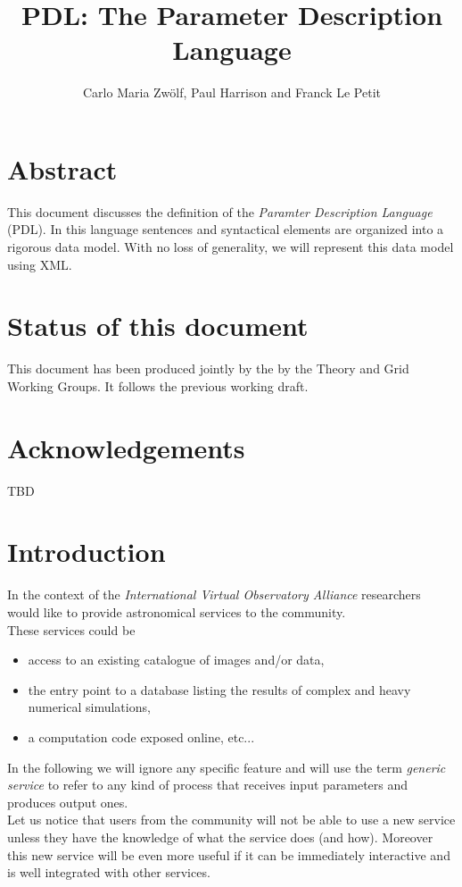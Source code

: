 \documentclass[a4paper,11pt] {ivoa}
\title{PDL: The Parameter Description Language}
\author{Carlo Maria Zw\"olf, Paul Harrison and Franck Le Petit}
\date{\pdldate}
\begin{document}
\maketitle
\section*{Abstract}
This document discusses the definition of the  {\it Paramter Description Language} (PDL). In this language sentences and syntactical elements are organized into a rigorous data model. With no loss of generality, we will represent this data model using XML.
\section{Status of this document}
This document has been produced jointly by the by the Theory and Grid Working Groups. It follows the previous working draft.
 
\section*{Acknowledgements}
TBD

\clearpage

\tableofcontents

\newpage

\section{Introduction}

In the context of the {\it International Virtual Observatory Alliance} researchers would like to
provide astronomical services to the community. \\
These services could be
\begin{itemize}
\item  access to an existing catalogue of images and/or data,
\item  the entry point to a database listing the results of complex  and heavy numerical simulations,
\item a computation code exposed online, etc... 
\end{itemize}
In the following we will ignore any specific feature and will use the term {\it generic service} to
refer to any kind of process that receives input parameters and produces output ones.\\

Let us notice that users from the community will not be able to use a new service unless they have
the knowledge of what the service does (and how).
Moreover this new service will be even more useful if it can be immediately interactive  and is well
integrated with other services.\\
\end{document}
